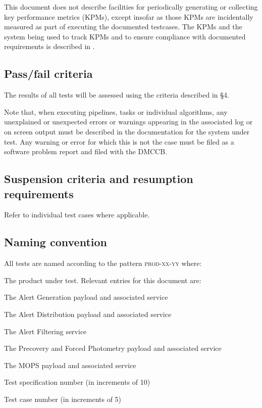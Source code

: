 \documentclass[DM,lsstdraft,STS,toc]{lsstdoc}
\begin{document}
This document does not describe facilities for periodically generating or
collecting key performance metrics (KPMs), except insofar as those KPMs are
incidentally measured as part of executing the documented testcases. The KPMs
and the system being used to track KPMs and to ensure compliance with
documented requirements is described in .

\subsection{Pass/fail criteria}
\label{sec:passfail}

The results of all tests will be assessed using the criteria described in
 \S4.

Note that, when executing pipelines, tasks or individual algorithms, any
unexplained or unexpected errors or warnings appearing in the associated log
or on screen output must be described in the documentation for the system
under test. Any warning or error for which this is not the case must be filed
as a software problem report and filed with the DMCCB.

\subsection{Suspension criteria and resumption requirements}
\label{suspension}

Refer to individual test cases where applicable.

\subsection{Naming convention}

All tests are named according to the pattern \textsc{prod-xx-yy} where:

\begin{description}[font=\normalfont\scshape]

  \item[prod]{The product under test. Relevant entries for this document are:
    \begin{description}[font=\normalfont\scshape,topsep=-1.0ex]
      \item[AG]{The Alert Generation payload and associated service}
      \item[AD]{The Alert Distribution payload and associated service}
      \item[AF]{The Alert Filtering service}
      \item[PFP]{The Precovery and Forced Photometry payload and associated
	      service}
      \item[MOPS]{The MOPS payload and associated service}
    \end{description}
  }
  \item[xx]{Test specification number (in increments of 10)}
  \item[yy]{Test case number (in increments of 5)}

\end{description}
\end{document}

